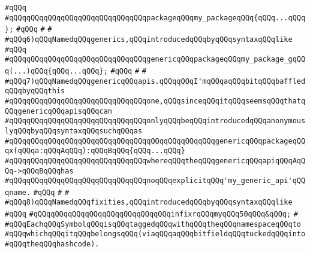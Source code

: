 \verb|#qQQq|\newline
\verb|#qQQqqQQqqQQqqQQqqQQqqQQqqQQqqQQqpackageqQQqmy_packageqQQq{qQQq...qQQq};|\newline
\verb|#qQQq|\newline
\verb|#|\newline
\verb|#|\newline
\verb|#qQQq6)qQQqNamedqQQqgenerics,qQQqintroducedqQQqbyqQQqsyntaxqQQqlike|\newline
\verb|#qQQq|\newline
\verb|#qQQqqQQqqQQqqQQqqQQqqQQqqQQqqQQqgenericqQQqpackageqQQqmy_package_gqQQq(...)qQQq{qQQq...qQQq};|\newline
\verb|#qQQq|\newline
\verb|#|\newline
\verb|#|\newline
\verb|#qQQq7)qQQqNamedqQQqgenericqQQqapis.qQQqqQQqI'mqQQqaqQQqbitqQQqbaffledqQQqbyqQQqthis|\newline
\verb|#qQQqqQQqqQQqqQQqqQQqqQQqqQQqqQQqone,qQQqsinceqQQqitqQQqseemsqQQqthatqQQqgenericqQQqapisqQQqcan|\newline
\verb|#qQQqqQQqqQQqqQQqqQQqqQQqqQQqqQQqonlyqQQqbeqQQqintroducedqQQqanonymouslyqQQqbyqQQqsyntaxqQQqsuchqQQqas|\newline
\verb|#qQQqqQQqqQQqqQQqqQQqqQQqqQQqqQQqqQQqqQQqqQQqqQQqgenericqQQqpackageqQQqx(qQQqa:qQQqAqQQq):qQQqBqQQq{qQQq...qQQq}|\newline
\verb|#qQQqqQQqqQQqqQQqqQQqqQQqqQQqqQQqwhereqQQqtheqQQqgenericqQQqapiqQQqAqQQq->qQQqBqQQqhas|\newline
\verb|#qQQqqQQqqQQqqQQqqQQqqQQqqQQqqQQqnoqQQqexplicitqQQq'my_generic_api'qQQqname.|\newline
\verb|#qQQq|\newline
\verb|#|\newline
\verb|#|\newline
\verb|#qQQq8)qQQqNamedqQQqfixities,qQQqintroducedqQQqbyqQQqsyntaxqQQqlike|\newline
\verb|#qQQq|\newline
\verb|#qQQqqQQqqQQqqQQqqQQqqQQqqQQqqQQqinfixrqQQqmyqQQq50qQQq&qQQq;|\newline
\verb|#|\newline
\verb|#qQQqEachqQQqSymbolqQQqisqQQqtaggedqQQqwithqQQqtheqQQqnamespaceqQQqto|\newline
\verb|#qQQqwhichqQQqitqQQqbelongsqQQq(viaqQQqaqQQqbitfieldqQQqtuckedqQQqinto|\newline
\verb|#qQQqtheqQQqhashcode).|\newline
